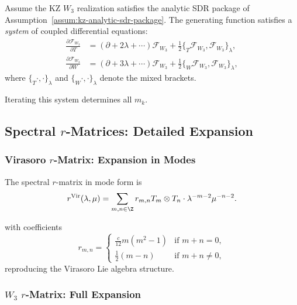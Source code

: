 \begin{theorem}
\label{thm:w3-gen-func-system}
Assume the KZ $W_3$ realization satisfies the analytic SDR package of
Assumption~\ref{assum:kz-analytic-sdr-package}.
The generating function satisfies a \emph{system} of coupled differential equations:
\begin{align}
\frac{\partial \mathcal{F}_{W_3}}{\partial T} &= (\partial + 2\lambda + \cdots) \mathcal{F}_{W_3} + \frac{1}{2} \{_T \mathcal{F}_{W_3}, \mathcal{F}_{W_3}\}_\lambda,\\
\frac{\partial \mathcal{F}_{W_3}}{\partial W} &= (\partial + 3\lambda + \cdots) \mathcal{F}_{W_3} + \frac{1}{2} \{_W \mathcal{F}_{W_3}, \mathcal{F}_{W_3}\}_\lambda,
\end{align}
where $\{_T \cdot, \cdot \}_\lambda$ and $\{_W \cdot, \cdot \}_\lambda$ denote the mixed brackets.
\end{theorem}

Iterating this system determines all $m_k$.

\subsection{Spectral $r$-Matrices: Detailed Expansion}

\subsubsection{Virasoro $r$-Matrix: Expansion in Modes}

The spectral $r$-matrix in mode form is
\begin{equation}
r^{\text{Vir}}(\lambda, \mu) = \sum_{m,n \in \Z} r_{m,n} T_m \otimes T_n \cdot \lambda^{-m-2} \mu^{-n-2}.
\end{equation}

with coefficients
\begin{equation}
r_{m,n} = \begin{cases}
\frac{c}{12} m(m^2-1) & \text{if } m+n = 0,\\
\frac{1}{2}(m-n) & \text{if } m+n \neq 0,
\end{cases}
\end{equation}
reproducing the Virasoro Lie algebra structure.

\subsubsection{$W_3$ $r$-Matrix: Full Expansion}

